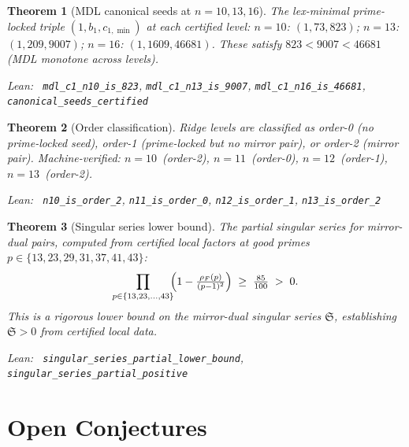 \documentclass[11pt,a4paper]{article}
\newenvironment{leanref}%
  {\par\smallskip\noindent\begingroup\raggedright\textup{Lean:}~}%
  {\par\endgroup}
\newtheorem{theorem}{Theorem}[section]
\theoremstyle{definition}
\begin{document}
\begin{theorem}[MDL canonical seeds at $n=10,13,16$]\label{thm:mdl-multi}
The lex-minimal prime-locked triple $(1,b_1,c_{1,\min})$ at each certified level:
$n=10$: $(1,73,823)$;\quad
$n=13$: $(1,209,9007)$;\quad
$n=16$: $(1,1609,46681)$.
These satisfy $823 < 9007 < 46681$ (MDL monotone across levels).

\begin{leanref} \lstinline|mdl_c1_n10_is_823|,
\lstinline|mdl_c1_n13_is_9007|,
\lstinline|mdl_c1_n16_is_46681|,
\lstinline|canonical_seeds_certified|
\end{leanref}
\end{theorem}

\begin{theorem}[Order classification]\label{thm:orders}
Ridge levels are classified as order-0 (no prime-locked seed), order-1 (prime-locked
but no mirror pair), or order-2 (mirror pair).  Machine-verified:
$n=10$~(order-2), $n=11$~(order-0), $n=12$~(order-1), $n=13$~(order-2).

\begin{leanref} \lstinline|n10_is_order_2|, \lstinline|n11_is_order_0|,
\lstinline|n12_is_order_1|, \lstinline|n13_is_order_2|
\end{leanref}
\end{theorem}

\begin{theorem}[Singular series lower bound]\label{thm:singular-series}
The partial singular series for mirror-dual pairs, computed from certified
local factors at good primes $p \in \{13, 23, 29, 31, 37, 41, 43\}$:
\[
  \prod_{p \in \{13,23,\ldots,43\}} \!\!\Bigl(1 - \tfrac{\rho_F(p)}{(p-1)^2}\Bigr)
  \;\ge\; \tfrac{85}{100} \;>\; 0.
\]
This is a rigorous lower bound on the mirror-dual singular series $\mathfrak{S}$,
establishing $\mathfrak{S} > 0$ from certified local data.

\begin{leanref} \lstinline|singular_series_partial_lower_bound|,
\lstinline|singular_series_partial_positive|
\end{leanref}
\end{theorem}

\section{Open Conjectures}\label{sec:conjectures}
\end{document}
